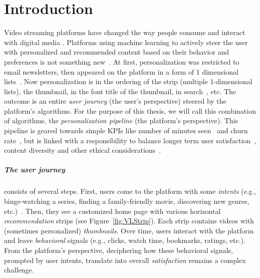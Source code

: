 
\chapter{Introduction}
\label{chapter:introduction}


Video streaming platforms have changed the way people consume and interact with digital media \cite{NetflixReco}. Platforms using machine learning to actively steer the user with personalized and recommended content based on their behavior and preferences is not something new~\cite{oldPersonalizationBehavior, oldPersonalizationSearch}. At first, personalization was restricted to email newsletters, then appeared on the platform in a form of 1 dimensional lists~\cite{oldReco}. Now personalization is in the ordering of the strip (multiple 1-dimensional lists), the thumbnail, in the font title of the thumbnail, in search~\cite{NetflixReco}, etc. The outcome is an entire \emph{user journey} (the user's perspective) steered by the platform's algorithms. For the purpose of this thesis, we will call this combination of algorithms, the \emph{personalization pipeline} (the platform's perspective). This pipeline is geared towards simple KPIs like number of minutes seen~\cite{spotifyIntent} and churn rate~\cite{oldChurn}, but is linked with a responsibility to balance longer term user satisfaction~\cite{longTerm}, content diversity and other ethical considerations~\cite{helberger}.

\paragraph{The user journey} consists of several steps. First, users come to the platform with some \emph{intents} (e.g., binge-watching a series, finding a family-friendly movie, discovering new genres, etc.)~\cite{intent}. Then, they see a customized home page with various horizontal \emph{recommendation} strips (see Figure~\ref{fig:VLStrip}). Each strip contains videos with (sometimes personalized) \emph{thumbnails}. Over time, users interact with the platform and leave \emph{behavioral} signals (e.g., clicks, watch time, bookmarks, ratings, etc.). From the platform's perspective, deciphering how these behavioral signals, prompted by user intents, translate into overall \emph{satisfaction} remains a complex challenge. 

